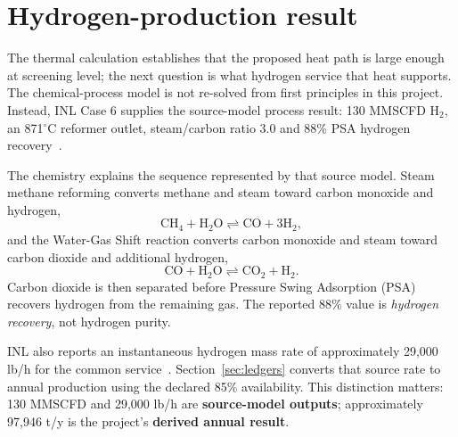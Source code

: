 \section{Hydrogen-production result}
The thermal calculation establishes that the proposed heat path is large enough at screening level; the next question is what hydrogen service that heat supports. The chemical-process model is not re-solved from first principles in this project. Instead, INL Case 6 supplies the source-model process result: 130 MMSCFD H$_2$, an 871$^\circ$C reformer outlet, steam/carbon ratio 3.0 and 88\% PSA hydrogen recovery~\cite{inltev953,inltev961}.

The chemistry explains the sequence represented by that source model. Steam methane reforming converts methane and steam toward carbon monoxide and hydrogen,
\[
\mathrm{CH_4+H_2O\rightleftharpoons CO+3H_2},
\]
and the Water-Gas Shift reaction converts carbon monoxide and steam toward carbon dioxide and additional hydrogen,
\[
\mathrm{CO+H_2O\rightleftharpoons CO_2+H_2}.
\]
Carbon dioxide is then separated before Pressure Swing Adsorption (PSA) recovers hydrogen from the remaining gas. The reported 88\% value is \emph{hydrogen recovery}, not hydrogen purity.

INL also reports an instantaneous hydrogen mass rate of approximately 29,000 lb/h for the common service~\cite{inltev953,inltev961}. Section~\ref{sec:ledgers} converts that source rate to annual production using the declared 85\% availability. This distinction matters: 130 MMSCFD and 29,000 lb/h are \textbf{source-model outputs}; approximately 97,946 t/y is the project's \textbf{derived annual result}.
